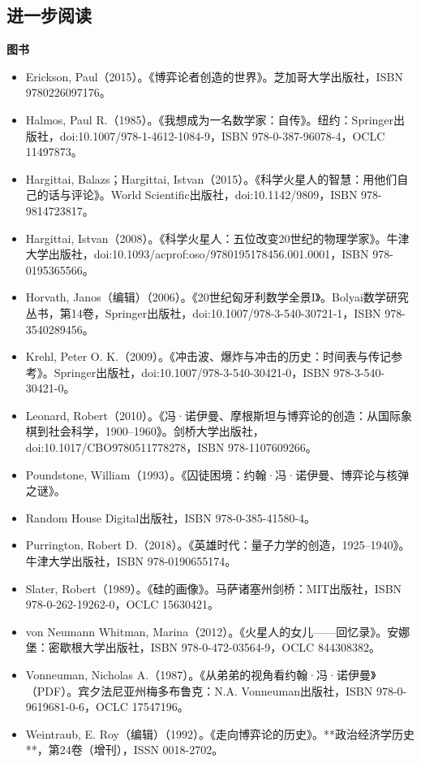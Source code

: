 \subsection{进一步阅读}
\textbf{图书}
\begin{itemize}
\item Erickson, Paul（2015）。《博弈论者创造的世界》。芝加哥大学出版社，ISBN 9780226097176。  
\item Halmos, Paul R.（1985）。《我想成为一名数学家：自传》。纽约：Springer出版社，doi:10.1007/978-1-4612-1084-9，ISBN 978-0-387-96078-4，OCLC 11497873。  
\item Hargittai, Balazs；Hargittai, Istvan（2015）。《科学火星人的智慧：用他们自己的话与评论》。World Scientific出版社，doi:10.1142/9809，ISBN 978-9814723817。  
\item Hargittai, Istvan（2008）。《科学火星人：五位改变20世纪的物理学家》。牛津大学出版社，doi:10.1093/acprof:oso/9780195178456.001.0001，ISBN 978-0195365566。  
\item Horvath, Janos（编辑）（2006）。《20世纪匈牙利数学全景I》。Bolyai数学研究丛书，第14卷，Springer出版社，doi:10.1007/978-3-540-30721-1，ISBN 978-3540289456。  
\item Krehl, Peter O. K.（2009）。《冲击波、爆炸与冲击的历史：时间表与传记参考》。Springer出版社，doi:10.1007/978-3-540-30421-0，ISBN 978-3-540-30421-0。  
\item Leonard, Robert（2010）。《冯·诺伊曼、摩根斯坦与博弈论的创造：从国际象棋到社会科学，1900–1960》。剑桥大学出版社，doi:10.1017/CBO9780511778278，ISBN 978-1107609266。  
\item Poundstone, William（1993）。《囚徒困境：约翰·冯·诺伊曼、博弈论与核弹之谜》。\item Random House Digital出版社，ISBN 978-0-385-41580-4。  
\item Purrington, Robert D.（2018）。《英雄时代：量子力学的创造，1925–1940》。牛津大学出版社，ISBN 978-0190655174。  
\item Slater, Robert（1989）。《硅的画像》。马萨诸塞州剑桥：MIT出版社，ISBN 978-0-262-19262-0，OCLC 15630421。  
\item von Neumann Whitman, Marina（2012）。《火星人的女儿——回忆录》。安娜堡：密歇根大学出版社，ISBN 978-0-472-03564-9，OCLC 844308382。  
\item Vonneuman, Nicholas A.（1987）。《从弟弟的视角看约翰·冯·诺伊曼》（PDF）。宾夕法尼亚州梅多布鲁克：N.A. Vonneuman出版社，ISBN 978-0-9619681-0-6，OCLC 17547196。  
\item Weintraub, E. Roy（编辑）（1992）。《走向博弈论的历史》。**政治经济学历史**，第24卷（增刊），ISSN 0018-2702。
\end{itemize}
